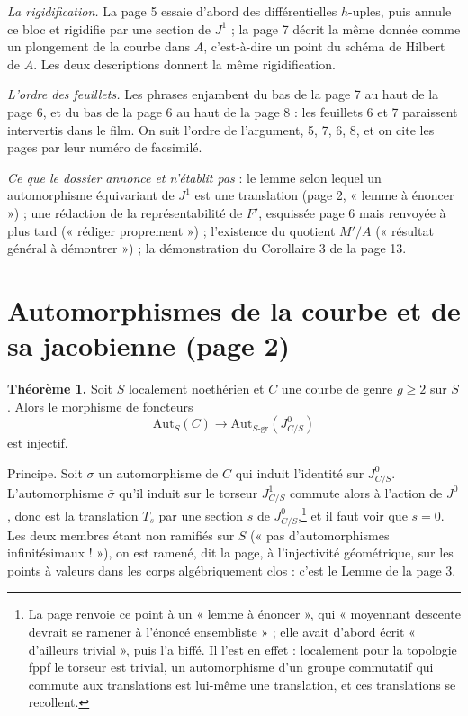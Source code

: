 \documentclass[11pt,a4paper]{article}
\begin{document}
\emph{La rigidification.} La page 5 essaie d'abord des différentielles
$h$-uples, puis annule ce bloc et rigidifie par une section de $J^{1}$ ; la
page 7 décrit la même donnée comme un plongement de la courbe dans $A$,
c'est-à-dire un point du schéma de Hilbert de $A$. Les deux descriptions donnent la même
rigidification.

\emph{L'ordre des feuillets.} Les phrases enjambent du bas de la page 7 au
haut de la page 6, et du bas de la page 6 au haut de la page 8 : les feuillets
6 et 7 paraissent intervertis dans le film. On suit l'ordre de l'argument,
5, 7, 6, 8, et on cite les pages par leur numéro de facsimilé.

\emph{Ce que le dossier annonce et n'établit pas} : le lemme selon lequel un
automorphisme équivariant de $J^{1}$ est une translation (page 2, « lemme à
énoncer ») ; une rédaction de la représentabilité de $F'$, esquissée page 6
mais renvoyée à plus tard (« rédiger proprement ») ; l'existence du quotient
$M'/A$ (« résultat général à démontrer ») ; la démonstration du Corollaire 3
de la page 13.

\section*{Automorphismes de la courbe et de sa jacobienne (page 2)}

\textbf{Théorème 1.} Soit $S$ localement noethérien et $C$ une courbe de genre
$g \geq 2$ sur $S$. Alors le morphisme de foncteurs
\[
  \mathrm{Aut}_{S}(C) \longrightarrow \mathrm{Aut}_{S\text{-gr}}(J^{0}_{C/S})
\]
est injectif.

Principe. Soit $\sigma$ un automorphisme de $C$ qui induit l'identité sur
$J^{0}_{C/S}$. L'automorphisme $\bar{\sigma}$ qu'il induit sur le torseur
$J^{1}_{C/S}$ commute alors à l'action de $J^{0}$, donc est la translation
$T_{s}$ par une section $s$ de $J^{0}_{C/S}$,\footnote{La page renvoie ce point
à un « lemme à énoncer », qui « moyennant descente devrait se ramener à
l'énoncé ensembliste » ; elle avait d'abord écrit « d'ailleurs trivial »,
puis l'a biffé. Il l'est en effet : localement pour la topologie fppf le
torseur est trivial, un automorphisme d'un groupe commutatif qui commute aux
translations est lui-même une translation, et ces translations se recollent.}
et il faut voir que $s = 0$. Les deux membres étant non ramifiés sur $S$
(« pas d'automorphismes infinitésimaux ! »), on est ramené, dit la page, à
l'injectivité géométrique, sur les points à valeurs dans les corps
algébriquement clos : c'est le Lemme de la page 3.
\end{document}
